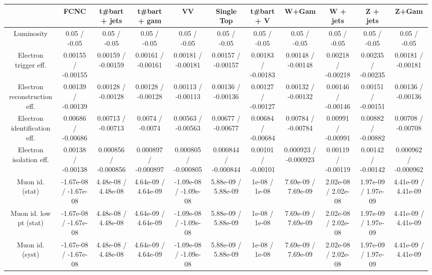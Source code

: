 \begin{table}[htbp]
\begin{center}
\footnotesize
\begin{tabular}{|c|c|c|c|c|c|c|c|c|c|c|}
\hline 
      & FCNC      & t#bar{t} + jets      & t#bar{t} +  gam      & VV      & Single Top      & t#bar{t} + V      & W+Gam      & W + jets      & Z + jets      & Z+Gam \\ 
\hline 
  Luminosity & 0.05 / -0.05 & 0.05 / -0.05 & 0.05 / -0.05 & 0.05 / -0.05 & 0.05 / -0.05 & 0.05 / -0.05 & 0.05 / -0.05 & 0.05 / -0.05 & 0.05 / -0.05 & 0.05 / -0.05 \\ 
  Electron trigger eff. & 0.00155 / -0.00155 & 0.00159 / -0.00159 & 0.00161 / -0.00161 & 0.00181 / -0.00181 & 0.00157 / -0.00157 & 0.00183 / -0.00183 & 0.00148 / -0.00148 & 0.00218 / -0.00218 & 0.00235 / -0.00235 & 0.00181 / -0.00181 \\ 
  Electron reconstruction eff. & 0.00139 / -0.00139 & 0.00128 / -0.00128 & 0.00128 / -0.00128 & 0.00113 / -0.00113 & 0.00136 / -0.00136 & 0.00127 / -0.00127 & 0.00132 / -0.00132 & 0.00146 / -0.00146 & 0.00151 / -0.00151 & 0.00136 / -0.00136 \\ 
  Electron identification eff. & 0.00686 / -0.00686 & 0.00713 / -0.00713 & 0.0074 / -0.0074 & 0.00563 / -0.00563 & 0.00677 / -0.00677 & 0.00684 / -0.00684 & 0.00784 / -0.00784 & 0.00991 / -0.00991 & 0.00882 / -0.00882 & 0.00708 / -0.00708 \\ 
  Electron isolation eff. & 0.00138 / -0.00138 & 0.000856 / -0.000856 & 0.000897 / -0.000897 & 0.000805 / -0.000805 & 0.000844 / -0.000844 & 0.00101 / -0.00101 & 0.000923 / -0.000923 & 0.00119 / -0.00119 & 0.00142 / -0.00142 & 0.000962 / -0.000962 \\ 
  Muon id. (stat) & -1.67e-08 / -1.67e-08 & 4.48e-08 / 4.48e-08 & 4.64e-09 / 4.64e-09 & -1.09e-08 / -1.09e-08 & 5.88e-09 / 5.88e-09 & 1e-08 / 1e-08 & 7.69e-09 / 7.69e-09 & 2.02e-08 / 2.02e-08 & 1.97e-09 / 1.97e-09 & 4.41e-09 / 4.41e-09 \\ 
  Muon id. low pt (stat) & -1.67e-08 / -1.67e-08 & 4.48e-08 / 4.48e-08 & 4.64e-09 / 4.64e-09 & -1.09e-08 / -1.09e-08 & 5.88e-09 / 5.88e-09 & 1e-08 / 1e-08 & 7.69e-09 / 7.69e-09 & 2.02e-08 / 2.02e-08 & 1.97e-09 / 1.97e-09 & 4.41e-09 / 4.41e-09 \\ 
  Muon id. (syst) & -1.67e-08 / -1.67e-08 & 4.48e-08 / 4.48e-08 & 4.64e-09 / 4.64e-09 & -1.09e-08 / -1.09e-08 & 5.88e-09 / 5.88e-09 & 1e-08 / 1e-08 & 7.69e-09 / 7.69e-09 & 2.02e-08 / 2.02e-08 & 1.97e-09 / 1.97e-09 & 4.41e-09 / 4.41e-09 \\ 

\end{tabular}
\end{center}
\end{table}

